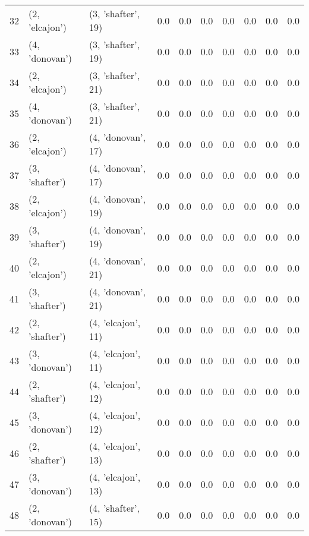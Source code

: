 \begin{tabular}{lllrrrrrrr}
32 &   (2, 'elcajon') &  (3, 'shafter', 19) &     0.0 &       0.0 &     0.0 &     0.0 &     0.0 &       0.0 &      0.0 \\
33 &   (4, 'donovan') &  (3, 'shafter', 19) &     0.0 &       0.0 &     0.0 &     0.0 &     0.0 &       0.0 &      0.0 \\
34 &   (2, 'elcajon') &  (3, 'shafter', 21) &     0.0 &       0.0 &     0.0 &     0.0 &     0.0 &       0.0 &      0.0 \\
35 &   (4, 'donovan') &  (3, 'shafter', 21) &     0.0 &       0.0 &     0.0 &     0.0 &     0.0 &       0.0 &      0.0 \\
36 &   (2, 'elcajon') &  (4, 'donovan', 17) &     0.0 &       0.0 &     0.0 &     0.0 &     0.0 &       0.0 &      0.0 \\
37 &   (3, 'shafter') &  (4, 'donovan', 17) &     0.0 &       0.0 &     0.0 &     0.0 &     0.0 &       0.0 &      0.0 \\
38 &   (2, 'elcajon') &  (4, 'donovan', 19) &     0.0 &       0.0 &     0.0 &     0.0 &     0.0 &       0.0 &      0.0 \\
39 &   (3, 'shafter') &  (4, 'donovan', 19) &     0.0 &       0.0 &     0.0 &     0.0 &     0.0 &       0.0 &      0.0 \\
40 &   (2, 'elcajon') &  (4, 'donovan', 21) &     0.0 &       0.0 &     0.0 &     0.0 &     0.0 &       0.0 &      0.0 \\
41 &   (3, 'shafter') &  (4, 'donovan', 21) &     0.0 &       0.0 &     0.0 &     0.0 &     0.0 &       0.0 &      0.0 \\
42 &   (2, 'shafter') &  (4, 'elcajon', 11) &     0.0 &       0.0 &     0.0 &     0.0 &     0.0 &       0.0 &      0.0 \\
43 &   (3, 'donovan') &  (4, 'elcajon', 11) &     0.0 &       0.0 &     0.0 &     0.0 &     0.0 &       0.0 &      0.0 \\
44 &   (2, 'shafter') &  (4, 'elcajon', 12) &     0.0 &       0.0 &     0.0 &     0.0 &     0.0 &       0.0 &      0.0 \\
45 &   (3, 'donovan') &  (4, 'elcajon', 12) &     0.0 &       0.0 &     0.0 &     0.0 &     0.0 &       0.0 &      0.0 \\
46 &   (2, 'shafter') &  (4, 'elcajon', 13) &     0.0 &       0.0 &     0.0 &     0.0 &     0.0 &       0.0 &      0.0 \\
47 &   (3, 'donovan') &  (4, 'elcajon', 13) &     0.0 &       0.0 &     0.0 &     0.0 &     0.0 &       0.0 &      0.0 \\
48 &   (2, 'donovan') &  (4, 'shafter', 15) &     0.0 &       0.0 &     0.0 &     0.0 &     0.0 &       0.0 &      0.0 \\

\end{tabular}
